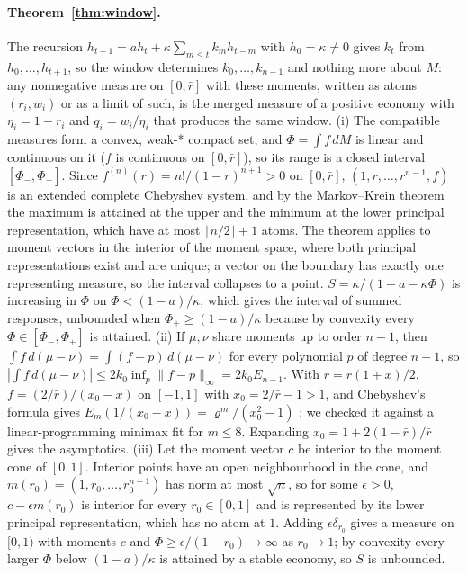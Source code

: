 \documentclass[12pt]{article}
\theoremstyle{definition}
\theoremstyle{remark}
\begin{document}
\paragraph{Theorem~\ref{thm:window}.} The recursion $h_{t+1}=ah_t+\kappa\sum_{m\le t}k_mh_{t-m}$ with $h_0=\kappa\neq0$ gives $k_t$ from $h_0,\ldots,h_{t+1}$, so the window determines $k_0,\ldots,k_{n-1}$ and nothing more about $M$: any nonnegative measure on $[0,\bar r]$ with these moments, written as atoms $(r_i,w_i)$ or as a limit of such, is the merged measure of a positive economy with $\eta_i=1-r_i$ and $q_i=w_i/\eta_i$ that produces the same window. (i) The compatible measures form a convex, weak-* compact set, and $\Phi=\int f\,dM$ is linear and continuous on it ($f$ is continuous on $[0,\bar r]$), so its range is a closed interval $[\Phi_-,\Phi_+]$. Since $f^{(n)}(r)=n!/(1-r)^{n+1}>0$ on $[0,\bar r]$, $(1,r,\ldots,r^{n-1},f)$ is an extended complete Chebyshev system, and by the Markov--Krein theorem \citep[Theorems IV.1.1 and IV.6.1]{krein1977} the maximum is attained at the upper and the minimum at the lower principal representation, which have at most $\lfloor n/2\rfloor+1$ atoms. The theorem applies to moment vectors in the interior of the moment space, where both principal representations exist and are unique; a vector on the boundary has exactly one representing measure, so the interval collapses to a point. $S=\kappa/(1-a-\kappa\Phi)$ is increasing in $\Phi$ on $\Phi<(1-a)/\kappa$, which gives the interval of summed responses, unbounded when $\Phi_+\ge(1-a)/\kappa$ because by convexity every $\Phi\in[\Phi_-,\Phi_+]$ is attained. (ii) If $\mu,\nu$ share moments up to order $n-1$, then $\int f\,d(\mu-\nu)=\int(f-p)\,d(\mu-\nu)$ for every polynomial $p$ of degree $n-1$, so $|\int f\,d(\mu-\nu)|\le2k_0\inf_p\|f-p\|_\infty=2k_0E_{n-1}$. With $r=\bar r(1+x)/2$, $f=(2/\bar r)/(x_0-x)$ on $[-1,1]$ with $x_0=2/\bar r-1>1$, and Chebyshev's formula gives $E_m(1/(x_0-x))=\varrho^m/(x_0^2-1)$ \citep{achieser1956}; we checked it against a linear-programming minimax fit for $m\le8$. Expanding $x_0=1+2(1-\bar r)/\bar r$ gives the asymptotics. (iii) Let the moment vector $c$ be interior to the moment cone of $[0,1]$. Interior points have an open neighbourhood in the cone, and $m(r_0)=(1,r_0,\ldots,r_0^{n-1})$ has norm at most $\sqrt n$, so for some $\epsilon>0$, $c-\epsilon m(r_0)$ is interior for every $r_0\in[0,1]$ and is represented by its lower principal representation, which has no atom at $1$. Adding $\epsilon\delta_{r_0}$ gives a measure on $[0,1)$ with moments $c$ and $\Phi\ge\epsilon/(1-r_0)\to\infty$ as $r_0\to1$; by convexity every larger $\Phi$ below $(1-a)/\kappa$ is attained by a stable economy, so $S$ is unbounded.
\end{document}

